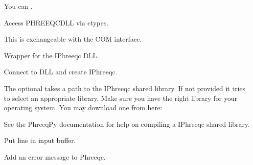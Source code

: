 \documentclass[letterpaper,10pt,english]{sphinxmanual}
\begin{document}
You can {\hyperref[\detokenize{index:installation}]{}}.

\label{\detokenize{iphreeqc:module-phreeqpy.iphreeqc.phreeqc_dll}}
Access PHREEQC\sphinxhyphen{}DLL via ctypes.

This is exchangeable with the COM interface.

\begin{fulllineitems}
\label{\detokenize{iphreeqc:phreeqpy.iphreeqc.phreeqc_dll.IPhreeqc}}
Wrapper for the IPhreeqc DLL.

Connect to DLL and create IPhreeqc.

The optional  takes a path to the IPhreeqc shared library.
If not provided it tries to select an appropriate library.
Make sure you have the right library for your operating system.
You may download one from here:

See the PhreeqPy documentation for help on compiling a IPhreeqc shared
library.

\begin{fulllineitems}
\label{\detokenize{iphreeqc:phreeqpy.iphreeqc.phreeqc_dll.IPhreeqc.accumulate_line}}
Put line in input buffer.

\end{fulllineitems}


\begin{fulllineitems}
\label{\detokenize{iphreeqc:phreeqpy.iphreeqc.phreeqc_dll.IPhreeqc.add_error}}
Add an error message to Phreeqc.


\end{fulllineitems}
\end{fulllineitems}
\end{document}
